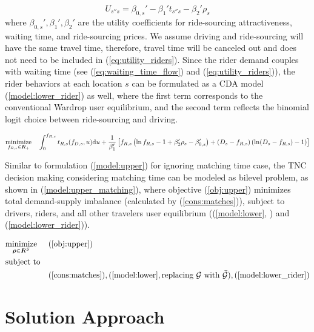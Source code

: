 \documentclass[review]{elsarticle}
\begin{document}
\begin{equation}
\label{eq:utility_riders}
U_{s''s} = \beta_{0,s}' -\beta_1' t_{s''s} - \beta_2' \rho_{s}
\end{equation}
where $\beta_{0,s}', \beta_{1}', \beta_{2}'$ are the utility coefficients for ride-sourcing attractiveness, waiting time, and ride-sourcing prices. We assume driving and ride-sourcing will have the same travel time, therefore, travel time will be canceled out and does not need to be included in (\ref{eq:utility_riders}). Since the rider demand couples with waiting time (see (\ref{eq:waiting_time_flow}) and (\ref{eq:utility_riders})), the rider behaviors at each location $s$ can be formulated as a CDA model (\ref{model:lower_rider}) as well, where the first term corresponds to the conventional Wardrop user equilibrium, and the second term reflects the binomial logit choice between ride-sourcing and driving.

\begin{equation}
\underset{{f}_{R,s} \in {I\kern-.35em R}_+}{\text{minimize}}\quad \int_{0}^{f_{R,s}} t_{R,s}(f_{D,s},u) \mathrm{d}u + \frac{1}{\beta_1'} \left[f_{R,s}\left(\ln f_{R,s} - 1 + \beta_2'\rho_s - \beta_{0,s}'\right) + (D_s - f_{R,s})\left(\ln (D_s - f_{R,s}) - 1  \right)\right]
\label{model:lower_rider}
\end{equation}

Similar to formulation (\ref{model:upper}) for ignoring matching time case, the TNC decision making considering matching time can be modeled as bilevel problem, as shown in (\ref{model:upper_matching}), where objective (\ref{obj:upper}) minimizes total demand-supply imbalance (calculated by (\ref{cons:matches})), subject to drivers, riders, and all other travelers user equilibrium ((\ref{model:lower}, ) and  (\ref{model:lower_rider})). 

\begin{subequations}
\begin{align}
& \underset{\boldsymbol{\rho} \in {I\kern-.35em R}^{S}}{\text{minimize}}
& &(\ref{obj:upper}) \\
& \text{subject to}  & & \nonumber \\
& && (\ref{cons:matches}) ,  (\ref{model:lower}, \text{replacing $\mathcal{G}$ with $\bar{\mathcal{G}}$}) ,  (\ref{model:lower_rider}) 
\end{align}
\label{model:upper_matching}
\end{subequations}

\section{Solution Approach}\label{sec:solu_meth}
\end{document}
